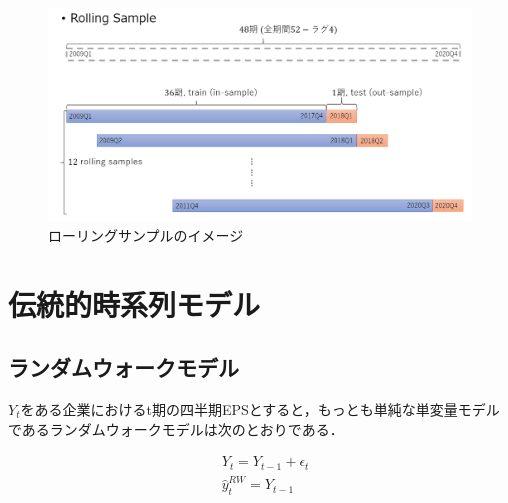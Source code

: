 \documentclass[a4paper，12pt]{jsarticle}
\begin{document}
\begin{figure}
  \centering
  \caption{ローリングサンプルのイメージ}
  \label{fig:rolling}
  \includegraphics[width=12cm]{./img/_rolling_sample.png}
\end{figure}

\section{伝統的時系列モデル}

\subsection{ランダムウォークモデル}

$Y_t$をある企業におけるt期の四半期EPSとすると，もっとも単純な単変量モデルであるランダムウォークモデルは次のとおりである．

\begin{equation}
  \begin{split}
    & Y_t = Y_{t-1} + \epsilon_t \\
    & \hat{y}_t^{RW} = Y_{t-1} \\
  \end{split}
\end{equation}        

\end{document}
